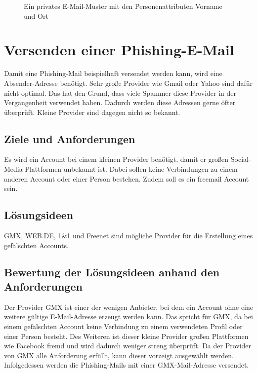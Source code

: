 			\begin{figure}[h!]
				\caption{Ein privates E-Mail-Muster mit den Personenattributen Vorname und Ort}
			\end{figure}
		

\clearpage	
\section{Versenden einer Phishing-E-Mail}
Damit eine Phishing-Mail beispielhaft versendet werden kann, wird eine Absender-Adresse benötigt. Sehr große Provider wie Gmail oder Yahoo sind dafür nicht optimal. Das hat den Grund, dass viele Spammer diese Provider in der Vergangenheit verwendet haben. Dadurch werden diese Adressen gerne öfter überprüft. Kleine Provider sind dagegen nicht so bekannt.\cite{Bazzell}
	\subsection{Ziele und Anforderungen}
	Es wird ein Account bei einem kleinen Provider benötigt, damit er großen Social-Media-Plattformen unbekannt ist. Dabei sollen keine Verbindungen zu einem anderen Account oder einer Person bestehen. Zudem soll es ein freemail Account sein.
	\subsection{Lösungsideen}
	GMX, WEB.DE, 1\&1 und Freenet sind mögliche Provider für die Erstellung eines gefälschten Accounts.
	\subsection{Bewertung der Lösungsideen anhand den Anforderungen}
 	Der Provider GMX ist einer der wenigen Anbieter, bei dem ein Account ohne eine weitere gültige E-Mail-Adresse erzeugt werden kann. Das spricht für GMX, da bei einem gefälschten Account keine Verbindung zu einem verwendeten Profil oder einer Person besteht. Des Weiteren ist dieser kleine Provider großen Plattformen wie Facebook fremd und wird dadurch weniger streng überprüft. Da der Provider von GMX alle Anforderung erfüllt, kann dieser vorzeigt ausgewählt werden. Infolgedessen werden die Phishing-Mails mit einer GMX-Mail-Adresse versendet. \cite{Bazzell}
